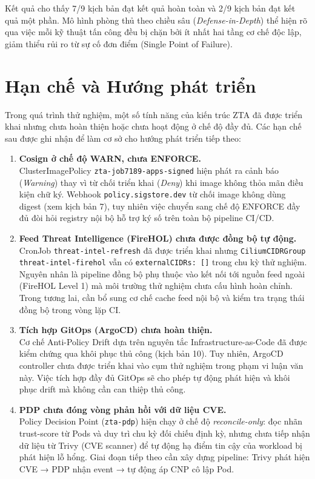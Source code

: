 Kết quả cho thấy 7/9 kịch bản đạt kết quả hoàn toàn và 2/9 kịch bản đạt kết quả một phần. Mô hình phòng thủ theo chiều sâu (\textit{Defense-in-Depth}) thể hiện rõ qua việc mỗi kỹ thuật tấn công đều bị chặn bởi ít nhất hai tầng cơ chế độc lập, giảm thiểu rủi ro từ sự cố đơn điểm (Single Point of Failure).

\section{Hạn chế và Hướng phát triển}
\label{sec:limitations}

Trong quá trình thử nghiệm, một số tính năng của kiến trúc ZTA đã được triển khai nhưng chưa hoàn thiện hoặc chưa hoạt động ở chế độ đầy đủ. Các hạn chế sau được ghi nhận để làm cơ sở cho hướng phát triển tiếp theo:

\begin{enumerate}
    \item \textbf{Cosign ở chế độ WARN, chưa ENFORCE.} \\
    ClusterImagePolicy \texttt{zta-job7189-apps-signed} hiện phát ra cảnh báo (\textit{Warning}) thay vì từ chối triển khai (\textit{Deny}) khi image không thỏa mãn điều kiện chữ ký. Webhook \texttt{policy.sigstore.dev} từ chối image không dùng digest (xem kịch bản 7), tuy nhiên việc chuyển sang chế độ ENFORCE đầy đủ đòi hỏi registry nội bộ hỗ trợ ký số trên toàn bộ pipeline CI/CD.

    \item \textbf{Feed Threat Intelligence (FireHOL) chưa được đồng bộ tự động.} \\
    CronJob \texttt{threat-intel-refresh} đã được triển khai nhưng \texttt{CiliumCIDRGroup threat-intel-firehol} vẫn có \texttt{externalCIDRs: []} trong chu kỳ thử nghiệm. Nguyên nhân là pipeline đồng bộ phụ thuộc vào kết nối tới nguồn feed ngoài (FireHOL Level 1) mà môi trường thử nghiệm chưa cấu hình hoàn chỉnh. Trong tương lai, cần bổ sung cơ chế cache feed nội bộ và kiểm tra trạng thái đồng bộ trong vòng lặp CI.

    \item \textbf{Tích hợp GitOps (ArgoCD) chưa hoàn thiện.} \\
    Cơ chế Anti-Policy Drift dựa trên nguyên tắc Infrastructure-as-Code đã được kiểm chứng qua khôi phục thủ công (kịch bản 10). Tuy nhiên, ArgoCD controller chưa được triển khai vào cụm thử nghiệm trong phạm vi luận văn này. Việc tích hợp đầy đủ GitOps sẽ cho phép tự động phát hiện và khôi phục drift mà không cần can thiệp thủ công.

    \item \textbf{PDP chưa đóng vòng phản hồi với dữ liệu CVE.} \\
    Policy Decision Point (\texttt{zta-pdp}) hiện chạy ở chế độ \textit{reconcile-only}: đọc nhãn trust-score từ Pods và duy trì chu kỳ đối chiếu định kỳ, nhưng chưa tiếp nhận dữ liệu từ Trivy (CVE scanner) để tự động hạ điểm tin cậy của workload bị phát hiện lỗ hổng. Giai đoạn tiếp theo cần xây dựng pipeline: Trivy phát hiện CVE → PDP nhận event → tự động áp CNP cô lập Pod.
\end{enumerate}

